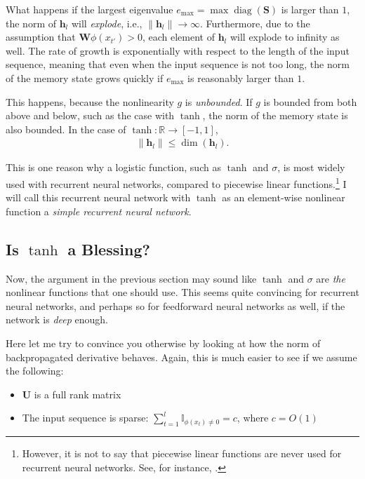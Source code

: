 \documentclass{report}
\newcommand{\vect}[1]{\mathbf{#1}}
\newcommand{\matr}[1]{\mathbf{#1}}
\newcommand{\diag}[0]{\operatorname{diag}}
\newcommand{\vh}[0]{\vect{h}}
\newcommand{\mW}[0]{\matr{W}}
\newcommand{\mU}[0]{\matr{U}}
\newcommand{\mS}{\matr{S}}
\newcommand{\RR}[0]{\mathbb{R}}
\newcommand{\II}[0]{\mathbb{I}}
\newcommand{\sigmoid}{\sigma}
\begin{document}
What happens if the largest eigenvalue $e_{\max} = \max \diag(\mS)$ is larger
than $1$, the norm of $\vh_l$ will {\em explode}, i.e., $\|\vh_l\| \to \infty$.
Furthermore, due to the assumption that $\mW\phi(x_{t'}) > 0$, each element of
$\vh_l$ will explode to infinity as well. The rate of growth is exponentially
with respect to  the length of the input sequence, meaning that even when the
input sequence is not too long, the norm of the memory state grows quickly if
$e_{\max}$ is reasonably larger than $1$. 

This happens, because the nonlinearity $g$ is {\em unbounded}. If $g$ is bounded
from both above and below, such as the case with $\tanh$, the norm of the memory
state is also bounded. In the case of $\tanh:\RR \to \left[ -1, 1\right]$,
\begin{align*}
    \|\vh_l\|\leq \dim(\vh_l).
\end{align*}

This is one reason why a logistic function, such as $\tanh$ and $\sigmoid$, is
most widely used with recurrent neural networks, compared to piecewise linear
functions.\footnote{
    However, it is not to say that piecewise linear functions are never used for
    recurrent neural networks. See, for instance,
    \cite{le2015simple,bengio2013advances}.
} I will call this recurrent neural network with $\tanh$ as an element-wise
nonlinear function a {\em simple recurrent neural network}. 

\subsection{Is $\tanh$ a Blessing?}
\label{sec:vanishing_grad}

Now, the argument in the previous section may sound like $\tanh$ and $\sigmoid$
are {\em the} nonlinear functions that one should use. This seems quite
convincing for recurrent neural networks, and perhaps so for feedforward neural
networks as well, if the network is {\em deep} enough.

Here let me try to convince you otherwise by looking at how the norm of
backpropagated derivative behaves. Again, this is much easier to see if we
assume the following:
\begin{itemize}
    \itemsep 0em
    \item $\mU$ is a full rank matrix
    \item The input sequence is sparse: $\sum_{t=1}^l \II_{\phi(x_t) \neq 0} =
        c$, where $c=O(1)$
\end{itemize}
\end{document}
